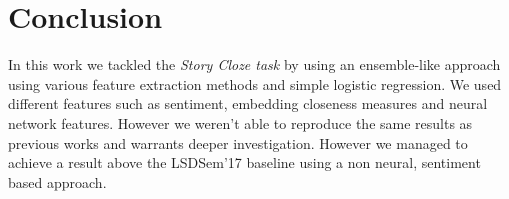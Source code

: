 \documentclass{article}
\begin{document}

\section{Conclusion}
In this work we tackled the \textit{Story Cloze task} by using an ensemble-like
approach using various feature extraction methods and simple logistic regression.
We used different features such as sentiment, embedding closeness measures and
neural network features. However we weren't able to reproduce the same results 
as previous works and warrants deeper investigation. However we managed to achieve
a result above the LSDSem'17 baseline using a non neural, sentiment based approach.



\end{document}
